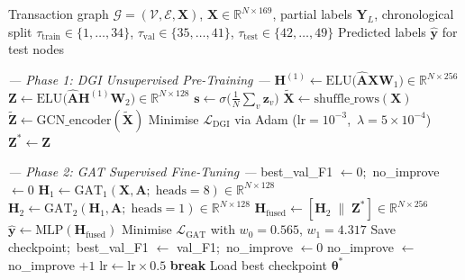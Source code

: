 \documentclass[12pt,a4paper]{article}
\begin{document}
\begin{algorithm}[htbp]
\caption{MixTrace Training and Inference}
\label{alg:mixtrace}
\begin{algorithmic}[1]
\Require Transaction graph
  $\mathcal{G}=(\mathcal{V},\mathcal{E},\mathbf{X})$,
  $\mathbf{X}\in\mathbb{R}^{N\times169}$,
  partial labels $\mathbf{Y}_L$, chronological split
  $\tau_\text{train}\!\in\!\{1,\ldots,34\}$,
  $\tau_\text{val}\!\in\!\{35,\ldots,41\}$,
  $\tau_\text{test}\!\in\!\{42,\ldots,49\}$
\Ensure Predicted labels $\hat{\mathbf{y}}$ for test nodes

\vspace{2pt}
\Statex \textit{--- Phase 1: DGI Unsupervised Pre-Training ---}
  \State $\mathbf{H}^{(1)} \leftarrow
    \text{ELU}\!\bigl(\hat{\mathbf{A}}\mathbf{X}\mathbf{W}_1\bigr)
    \in \mathbb{R}^{N\times256}$
  \State $\mathbf{Z} \leftarrow
    \text{ELU}\!\bigl(\hat{\mathbf{A}}\mathbf{H}^{(1)}\mathbf{W}_2\bigr)
    \in \mathbb{R}^{N\times128}$
  \State $\mathbf{s} \leftarrow
    \sigma\!\bigl(\tfrac{1}{N}\textstyle\sum_v\mathbf{z}_v\bigr)$
  \State $\tilde{\mathbf{X}} \leftarrow \text{shuffle\_rows}(\mathbf{X})$
  \State $\tilde{\mathbf{Z}} \leftarrow
    \text{GCN\_encoder}(\tilde{\mathbf{X}})$
  \State Minimise $\mathcal{L}_\text{DGI}$ via Adam
    ($\text{lr}=10^{-3}$,\ $\lambda=5\times10^{-4}$)
\EndFor
\State $\mathbf{Z}^* \leftarrow \mathbf{Z}$

\vspace{2pt}
\Statex \textit{--- Phase 2: GAT Supervised Fine-Tuning ---}
\State best\_val\_F1 $\leftarrow 0$;\ no\_improve $\leftarrow 0$
  \State $\mathbf{H}_1 \leftarrow
    \text{GAT}_1(\mathbf{X},\mathbf{A};\;\text{heads}=8)
    \in \mathbb{R}^{N\times128}$
  \State $\mathbf{H}_2 \leftarrow
    \text{GAT}_2(\mathbf{H}_1,\mathbf{A};\;\text{heads}=1)
    \in \mathbb{R}^{N\times128}$
  \State $\mathbf{H}_\text{fused} \leftarrow
    [\mathbf{H}_2 \;\|\; \mathbf{Z}^*]
    \in \mathbb{R}^{N\times256}$
  \State $\hat{\mathbf{y}} \leftarrow
    \text{MLP}(\mathbf{H}_\text{fused})$
  \State Minimise $\mathcal{L}_\text{GAT}$ with
    $w_0\!=\!0.565$, $w_1\!=\!4.317$
    \State Save checkpoint;\ best\_val\_F1 $\leftarrow$ val\_F1;\ no\_improve $\leftarrow 0$
  \Else
    \State no\_improve $\leftarrow$ no\_improve $+1$
      \State $\text{lr} \leftarrow \text{lr} \times 0.5$
    \EndIf
      \textbf{ break}
    \EndIf
  \EndIf
\EndFor
\State Load best checkpoint $\boldsymbol{\theta}^*$


\end{algorithmic}
\end{algorithm}
\end{document}

